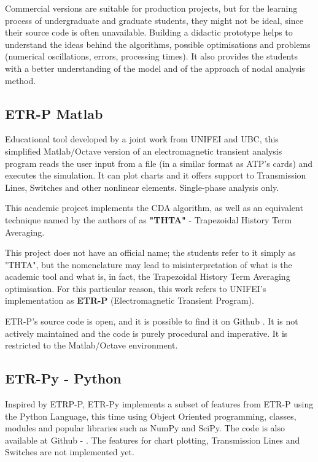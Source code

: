 Commercial versions are suitable for production projects, but for the learning process of undergraduate and graduate students, they might not be ideal, since their source code is often unavailable. Building a didactic prototype helps to understand the ideas behind the algorithms, possible optimisations and problems (numerical oscillations, errors, processing times). It also provides the students with a better understanding of the model and of the approach of nodal analysis method.

\subsection{ETR-P Matlab} \label{etr:thta}

Educational tool developed by a joint work from UNIFEI and UBC, this simplified Matlab/Octave version of an electromagnetic transient analysis program reads the user input from a file (in a similar format as ATP's cards) and executes the simulation. It can plot charts and it offers support to Transmission Lines, Switches and other nonlinear elements. Single-phase analysis only.

This academic project implements the CDA algorithm, as well as an equivalent technique  named by the authors of \cite{thta2015bonatto} as \textbf{"THTA"} - Trapezoidal History Term Averaging.

This project does not have an official name; the students refer to it simply as "THTA", but the nomenclature may lead to misinterpretation of what is the academic tool and what is, in fact, the Trapezoidal History Term Averaging optimisation. For this particular reason, this work refers to UNIFEI's implementation as \textbf{ETR-P} (Electromagnetic Transient Program).

ETR-P's source code is open, and it is possible to find it on Github \cite{thtaoctave}. It is not actively maintained and the code is purely procedural and imperative. It is restricted to the Matlab/Octave environment.

\subsection{ETR-Py - Python} \label{etr:pythta}

Inspired by ETRP-P, ETR-Py \cite{tavante2018open} implements a subset of features from ETR-P using the Python Language, this time using Object Oriented programming, classes, modules and popular libraries such as NumPy and SciPy. The code is also available at Github - \cite{pythta}. The features for chart plotting, Transmission Lines and Switches are not implemented yet.

